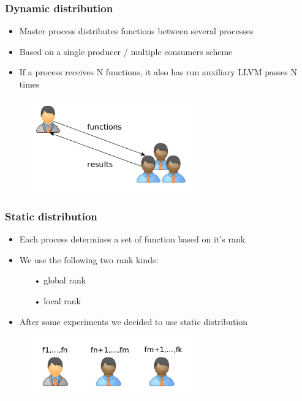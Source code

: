 \begin{frame}
\frametitle{Dynamic distribution}
\begin{itemize}
\item Master process distributes functions between several processes
\item Based on a single producer / multiple consumers scheme
\item If a process receives N functions, it also has run auxiliary LLVM passes N times
\end{itemize}
	\begin{figure}
		\includegraphics[width=70mm]{image/dynDistr.png}
	\end{figure}	
\end{frame}


\begin{frame}
\frametitle{Static distribution}
\begin{itemize}
\item Each process determines a set of function based on it's rank
\item We use the following two rank kinds:
	\begin{itemize}
		\item[•] global rank
		\item[•] local rank 
	\end{itemize}
\item After some experiments we decided to use static distribution
\end{itemize}
	\begin{figure}
		\includegraphics[width=70mm]{image/statDistr.png}
	\end{figure}	
\end{frame}

